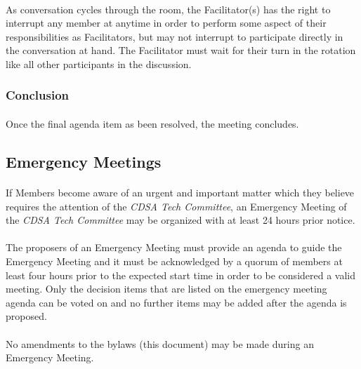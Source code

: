 \documentclass[12pt,letter,twocolumn,oneside,draft]{article}
\newcommand{\cname}{\emph{CDSA Tech Committee}}
\begin{document}
\paragraph{}
As conversation cycles through the room, the Facilitator(s) has the right to
interrupt any member at anytime in order to perform some aspect of their
responsibilities as Facilitators, but may not interrupt to participate directly
in the conversation at hand. The Facilitator must wait for their turn in the
rotation like all other participants in the discussion.

\subsubsection{Conclusion}

\paragraph{}
Once the final agenda item as been resolved, the meeting concludes.

\subsection{Emergency Meetings}

\paragraph{}
If Members become aware of an urgent and important matter which they believe
requires the attention of the \cname{}, an Emergency Meeting of the \cname{}
may be organized with at least 24 hours prior notice. 

\paragraph{}
The proposers of an Emergency Meeting must provide an agenda to guide the Emergency
Meeting and it must be acknowledged by a quorum of members at least four hours
prior to the expected start time in order to be considered a valid meeting.
Only the decision items that are listed on the emergency meeting agenda can be
voted on and no further items may be added after the agenda is proposed. 

\paragraph{}
No amendments to the bylaws (this document) may be made during an Emergency
Meeting.
\end{document}
